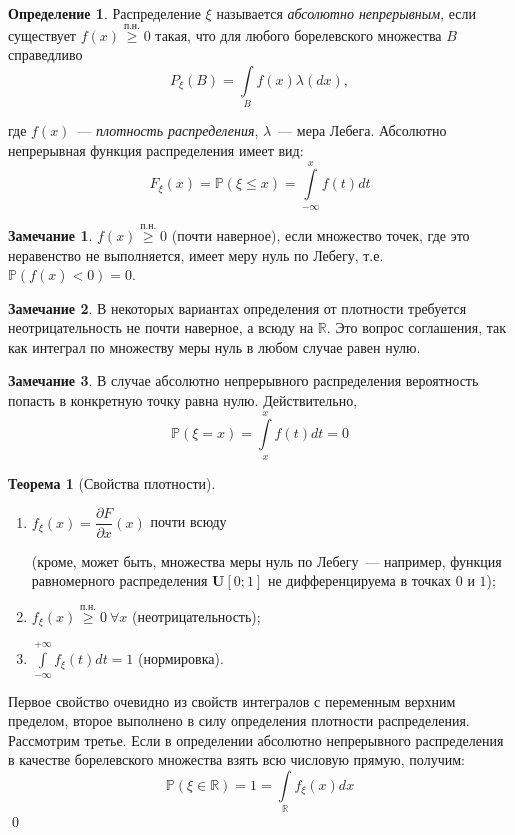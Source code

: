 \documentclass[oneside,final,14pt]{extreport}
\renewenvironment{proof}{{\bfseries Доказательство.}}{\qed}
\theoremstyle{plain}
\theoremstyle{definition}
\newtheorem*{defn}{Определение}
\newtheorem*{rmrk}{Замечание}
\theoremstyle{named}
\newtheorem*{namedthm}{Теорема}
\begin{document}
\begin{defn}
    Распределение $\xi$ называется {\it абсолютно непрерывным}, если существует $f(x) \overset{\text{п.н.}}{\geqslant} 0$ такая, что для любого борелевского множества $B$ справедливо
    \begin{equation*}
        P_\xi(B) = \int\limits_B f(x) \lambda(dx),
    \end{equation*}
    
    где $f(x)$~--- {\it плотность распределения}, $\lambda$~--- мера Лебега. Абсолютно непрерывная функция распределения имеет вид:
    \begin{equation*}
        F_\xi(x) = \mathbb{P}(\xi \leqslant x) = \int\limits_{-\infty}^x f(t)dt
    \end{equation*}
\end{defn}
\begin{rmrk}
    $f(x) \overset{\text{п.н.}}{\geqslant} 0$ (почти наверное), если множество точек, где это неравенство не выполняется, имеет меру нуль по Лебегу, т.е. $\mathbb{P}(f(x) < 0) = 0$.
\end{rmrk}
\begin{rmrk}
    В некоторых вариантах определения от плотности требуется неотрицательность не почти наверное, а всюду на $\mathbb{R}$. Это вопрос соглашения, так как интеграл по множеству меры нуль в любом случае равен нулю.
\end{rmrk}

\begin{rmrk}
    В случае абсолютно непрерывного распределения вероятность попасть в конкретную точку равна нулю. Действительно,
    \begin{equation*}
        \mathbb{P}(\xi = x) = \int\limits_{x}^{x} f(t)dt = 0
    \end{equation*}
\end{rmrk}
\begin{namedthm}[Свойства плотности]\leavevmode
\begin{enumerate}
    \item $f_{\xi}(x) = \dfrac{\partial{F}}{\partial{x}}(x)$ почти всюду 
    
    (кроме, может быть, множества меры нуль по Лебегу~--- например, функция равномерного распределения $\mathbf{U}[0;1]$ не дифференцируема в точках $0$ и $1$);
    \item $f_\xi(x) \overset{\text{п.н.}}{\geqslant} 0~ \forall x$ (неотрицательность);
    \item $\int\limits_{-\infty}^{+\infty} f_\xi(t) dt = 1$ (нормировка).
\end{enumerate}
\end{namedthm}
\begin{proof}
    Первое свойство очевидно из свойств интегралов с переменным верхним пределом, второе выполнено в силу определения плотности распределения. Рассмотрим третье. Если в определении абсолютно непрерывного распределения в качестве борелевского множества взять всю числовую прямую, получим: 
    \begin{equation*}
        \mathbb{P}(\xi \in \mathbb{R})=1=\int\limits_{\mathbb{R}} f_{\xi}(x) dx
    \end{equation*}
\end{proof}
\end{document}

